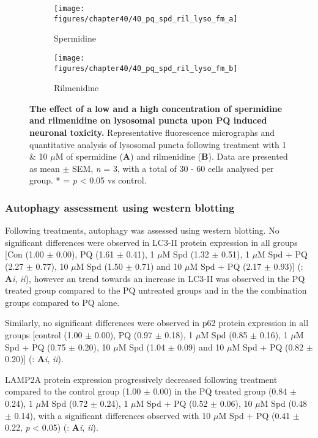 \begin{figure}[H]
  \center
  \begin{subfigure}[b]{0.495\linewidth}
    \texttt{[image: figures/chapter40/40\_pq\_spd\_ril\_lyso\_fm\_a]}
    \caption{Spermidine}
  \end{subfigure}
  \begin{subfigure}[b]{0.495\linewidth}
    \texttt{[image: figures/chapter40/40\_pq\_spd\_ril\_lyso\_fm\_b]}
    \caption{Rilmenidine}
  \end{subfigure}
  \caption[The effect of a low and a high concentration of spermidine and rilmenidine on lysosomal puncta upon PQ-induced neuronal toxicity]{\textbf{The effect of a low and a high concentration of spermidine and rilmenidine on lysosomal puncta upon PQ induced neuronal toxicity.} Representative fluorescence micrographs and quantitative analysis of lysosomal puncta following treatment with 1 \& 10 $\mu$M of spermidine (\textbf{A}) and rilmenidine (\textbf{B}). Data are presented as mean $\pm$ SEM, \textit{n} = 3, with a total of 30 - 60 cells analysed per group. * = \textit{p} < 0.05 vs control.}
  \label{fig:40_pq_spd_ril_lyso_fm_a}
\end{figure}

\subsubsection{Autophagy assessment using western blotting}
Following treatments, autophagy was assessed using western blotting. No significant differences were observed in LC3-II protein expression in all groups [Con (1.00 $\pm$ 0.00), PQ (1.61 $\pm$ 0.41), 1 $\mu$M Spd (1.32 $\pm$ 0.51), 1 $\mu$M Spd + PQ (2.27 $\pm$ 0.77), 10 $\mu$M Spd (1.50 $\pm$ 0.71) and 10 $\mu$M Spd + PQ (2.17 $\pm$ 0.93)] (: \textbf{A}\textit{i}, \textit{ii}), however an trend towards an increase in LC3-II was observed in the PQ treated group compared to the PQ untreated groups and in the the combination groups compared to PQ alone.

Similarly, no significant differences were observed in p62 protein expression in all groups [control (1.00 $\pm$ 0.00), PQ (0.97 $\pm$ 0.18), 1 $\mu$M Spd (0.85 $\pm$ 0.16), 1 $\mu$M Spd + PQ (0.75 $\pm$ 0.20), 10 $\mu$M Spd (1.04 $\pm$ 0.09) and 10 $\mu$M Spd + PQ (0.82 $\pm$ 0.20)] (: \textbf{A}\textit{i}, \textit{ii}).

LAMP2A protein expression progressively decreased following treatment compared to the control group (1.00 $\pm$ 0.00) in the PQ treated group (0.84 $\pm$ 0.24), 1 $\mu$M Spd (0.72 $\pm$ 0.24), 1 $\mu$M Spd + PQ (0.52 $\pm$ 0.06), 10 $\mu$M Spd (0.48 $\pm$ 0.14), with a  significant differences observed with 10 $\mu$M Spd + PQ (0.41 $\pm$ 0.22, \textit{p} < 0.05) (: \textbf{A}\textit{i}, \textit{ii}). 

